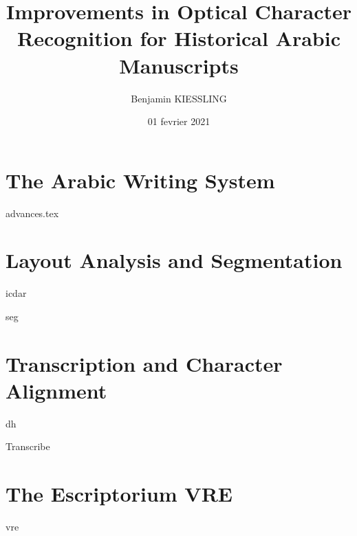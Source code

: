 \documentclass[a4paper, 12pt]{book}
\title{Improvements in Optical Character Recognition for Historical Arabic Manuscripts}
\author{Benjamin KIESSLING}
\institute{École Pratique des autes Études}
\date{01 fevrier 2021}
\begin{document}
\maketitle{}

\frontmatter

\cleardoublepage

\cleardoublepage


\tableofcontents
\listoffigures
\listoftables

\mainmatter
\begin{refsection}

\printbibliography[heading=subbibliography]
\end{refsection}
\cleardoublepage
\part{The Arabic Writing System}
\begin{refsection}

\printbibliography[heading=subbibliography]
\end{refsection}
\begin{refsection}
{advances.tex}
\printbibliography[heading=subbibliography]
\end{refsection}
\part{Layout Analysis and Segmentation}
\begin{refsection}
{icdar}
\printbibliography[heading=subbibliography]
\end{refsection}
\begin{refsection}
{seg}
\printbibliography[heading=subbibliography]
\end{refsection}
\cleardoublepage

\part{Transcription and Character Alignment}
\cleardoublepage
\begin{refsection}
{dh}
\printbibliography[heading=subbibliography]
\end{refsection}
\begin{refsection}
{Transcribe}
\printbibliography[heading=subbibliography]
\end{refsection}

\part{The Escriptorium VRE}
\cleardoublepage
\begin{refsection}
{vre}
\printbibliography[heading=subbibliography]
\end{refsection}

\appendix



\printbibliography
\end{document}
